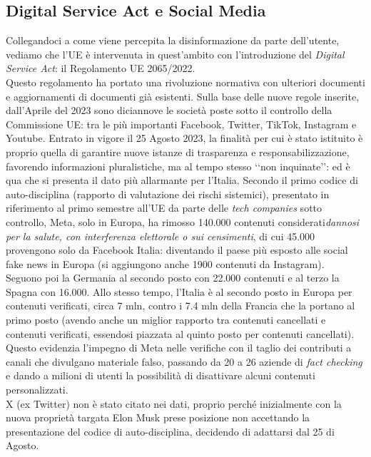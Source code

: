 \documentclass{article}
\begin{document}
\centering\newpage\subsection{Digital Service Act e Social Media}
\begin{justify}
    Collegandoci a come viene percepita la disinformazione da parte dell'utente, vediamo che l'UE è intervenuta in quest'ambito con l'introduzione del \textit{Digital Service Act}: il Regolamento UE 2065/2022.\\
    Questo regolamento ha portato una rivoluzione normativa con ulteriori documenti e aggiornamenti di documenti già esistenti.
    Sulla base delle nuove regole inserite, dall'Aprile del 2023 sono diciannove le società poste sotto il controllo della Commissione UE: tra le più importanti Facebook, Twitter, TikTok, Instagram e Youtube.\citep{dariano_disinformazione_2023}
    Entrato in vigore il 25 Agosto 2023, la finalità per cui è stato istituito è proprio quella di garantire nuove istanze di trasparenza e responsabilizzazione, favorendo informazioni pluralistiche, ma al tempo stesso ‘‘non inquinate’’:
    ed è qua che si presenta il dato più allarmante per l'Italia. Secondo il primo codice di auto-disciplina (rapporto di valutazione dei rischi sistemici), presentato in riferimento al primo semestre all'UE da parte delle \textit{tech companies} sotto controllo, Meta, solo in Europa, ha rimosso 140.000 contenuti considerati\textit{dannosi per la salute, con interferenza elettorale o sui censimenti}, di cui 45.000 provengono solo da Facebook Italia: diventando il paese più esposto alle social fake news in Europa (si aggiungono anche 1900 contenuti da Instagram).\\
    Seguono poi la Germania al secondo posto con 22.000 contenuti e al terzo la Spagna con 16.000.
    Allo stesso tempo, l'Italia è al secondo posto in Europa per contenuti verificati, circa 7 mln, contro i 7.4 mln della Francia che la portano al primo posto (avendo anche un miglior rapporto tra contenuti cancellati e contenuti verificati, essendosi piazzata al quinto posto per contenuti cancellati).
    Questo evidenzia l'impegno di Meta nelle verifiche con il taglio dei contributi a canali che divulgano materiale falso, passando da 20 a 26 aziende di \textit{fact checking} e dando a milioni di utenti la possibilità di disattivare alcuni contenuti personalizzati.\citep{tg24_fake_2023}\\
    X (ex Twitter) non è stato citato nei dati, proprio perché inizialmente con la nuova proprietà targata Elon Musk prese posizione non accettando la presentazione del codice di auto-disciplina, decidendo di adattarsi dal 25 di Agosto.\\

\end{justify}
\end{document}
